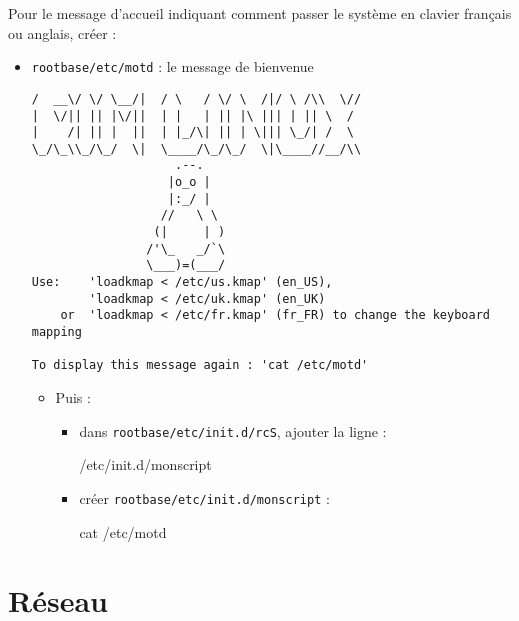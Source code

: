 \documentclass[]{article}
\newenvironment{Shaded}{}{}
\newcommand{\FunctionTok}[1]{\textcolor[rgb]{0.02,0.16,0.49}{{#1}}}
\newcommand{\ExtensionTok}[1]{{#1}}
\newcommand{\NormalTok}[1]{{#1}}
\begin{document}
Pour le message d'accueil indiquant comment passer le système en clavier
français ou anglais, créer :

\begin{itemize}
\item
  \texttt{rootbase/etc/motd} : le message de bienvenue

\begin{verbatim}
/  __\/ \/ \__/|  / \   / \/ \  /|/ \ /\\  \//
|  \/|| || |\/||  | |   | || |\ ||| | || \  /
|    /| || |  ||  | |_/\| || | \||| \_/| /  \
\_/\_\\_/\_/  \|  \____/\_/\_/  \|\____//__/\\
                    .--.
                   |o_o |
                   |:_/ |
                  //   \ \
                 (|     | )
                /'\_   _/`\
                \___)=(___/  
Use:    'loadkmap < /etc/us.kmap' (en_US),
        'loadkmap < /etc/uk.kmap' (en_UK)
    or  'loadkmap < /etc/fr.kmap' (fr_FR) to change the keyboard mapping

To display this message again : 'cat /etc/motd'
\end{verbatim}

  \begin{itemize}
  \item
    Puis :

    \begin{itemize}
    \item
      dans \texttt{rootbase/etc/init.d/rcS}, ajouter la ligne :

\begin{Shaded}
\begin{Highlighting}[]
\ExtensionTok{/etc/init.d/monscript}
\end{Highlighting}
\end{Shaded}
    \item
      créer \texttt{rootbase/etc/init.d/monscript} :

\begin{Shaded}
\begin{Highlighting}[]
\FunctionTok{cat} \NormalTok{/etc/motd}
\end{Highlighting}
\end{Shaded}
    \end{itemize}
  \end{itemize}
\end{itemize}

\section{Réseau}\label{ruxe9seau}
\end{document}
